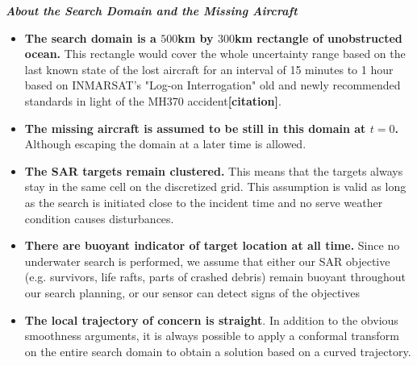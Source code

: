 \documentclass[12pt, letterpaper]{article}  %
\theoremstyle{definition}
\theoremstyle{remark}
\theoremstyle{plain}
\begin{document}
\textit{\textbf{About the Search Domain and the Missing Aircraft}}
\begin{itemize}
\item \textbf{The search domain is a $500$km by $300$km rectangle of unobstructed ocean.} This rectangle would cover the whole uncertainty range based on 
the last known state of the lost aircraft for an interval of 15 minutes to 1 hour based on INMARSAT's "Log-on Interrogation" old and newly recommended standards in light of the MH370 accident\textbf{[citation]}.
\item \textbf{The missing aircraft is assumed to be still in this domain at $t=0$.} Although escaping the domain at a later time is allowed.
\item \textbf{The SAR targets remain clustered.} This means that the targets always stay in the same cell on the discretized grid. This assumption is valid as long as the search is initiated close to the incident time and no serve weather condition causes disturbances.
\item \textbf{There are buoyant indicator of target location at all time.} Since no underwater search is performed, we assume that either our SAR objective (e.g. survivors, life rafts, parts of crashed debris) remain buoyant throughout our search planning, or our sensor can detect signs of the objectives 
\item \textbf{The local trajectory of concern is straight}. In addition to the obvious smoothness arguments, it is always possible to apply a conformal transform on the entire search domain to obtain a solution based on a curved trajectory.


\end{itemize}
\end{document}
